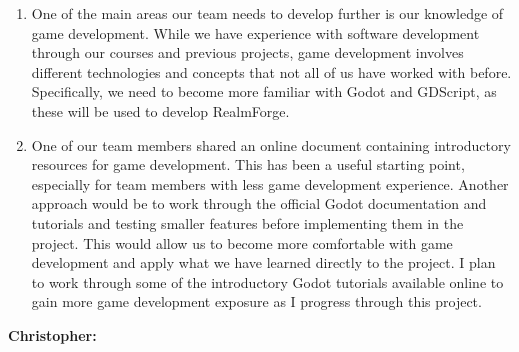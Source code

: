 \documentclass{scrreprt}
\theoremstyle{definition}
\begin{document}
\begin{enumerate}
		\item One of the main areas our team needs to develop further is our knowledge of game development. While we have experience with software development through our courses and previous projects, game development involves different technologies and concepts that not all of us have worked with before. Specifically, we need to become more familiar with Godot and GDScript, as these will be used to develop RealmForge. 
		\item One of our team members shared an online document containing introductory resources for game development. This has been a useful starting point, especially for team members with less game development experience. Another approach would be to work through the official Godot documentation and tutorials and testing smaller features before implementing them in the project. This would allow us to become more comfortable with game development and apply what we have learned directly to the project. I plan to work through some of the introductory Godot tutorials available online to gain more game development exposure as I progress through this project. 
	\end{enumerate}
	
	\textbf{Christopher:}
	
\end{document}
